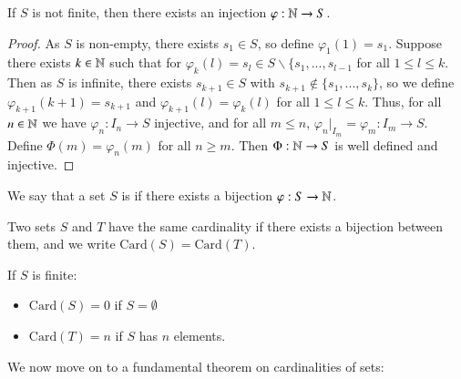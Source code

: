 \begin{proposition}\label{prop:1.8.7}
    If $S$ is not finite, then there exists an injection $\varphi:\mathbb N\rightarrow S$.
\end{proposition}
\begin{proof}
    As $S$ is non-empty, there exists $s_1 \in S$, so define $\varphi_1(1) = s_1$. Suppose there exists $k \in \mathbb N$ such that for $\varphi_k(l) = s_l \in S\backslash\{s_1,...,s_{l-1}$ for all $1 \leq l \leq k$. Then as $S$ is infinite, there exists $s_{k+1} \in S$ with $s_{k+1} \notin \{s_1,...,s_k\}$, so we define $\varphi_{k+1}(k+1) = s_{k+1}$ and $\varphi_{k+1}(l) = \varphi_k(l)$ for all $1 \leq l \leq k$. Thus, for all $n \in \mathbb N$ we have $\varphi_n:I_n\rightarrow S$ injective, and for all $m \leq n$, $\varphi_n\vert_{I_m} = \varphi_m:I_m\rightarrow S$. Define $\Phi(m) = \varphi_n(m)$ for all $n \geq m$. Then $\Phi:\mathbb N\rightarrow S$ is well defined and injective.
\end{proof}

\begin{definition}
    We say that a set $S$ is  if there exists a bijection $\varphi:S\rightarrow \mathbb N$.
\end{definition}

\begin{definition}
    Two sets $S$ and $T$ have the same cardinality if there exists a bijection between them, and we write $\text{Card}(S) = \text{Card}(T)$.
\end{definition}

\begin{definition}
    If $S$ is finite: \begin{itemize}
        \item $\text{Card}(S) = 0$ if $S = \emptyset$
        \item $\text{Card}(T) = n$ if $S$ has $n$ elements.
    \end{itemize}
\end{definition}

We now move on to a fundamental theorem on cardinalities of sets:

